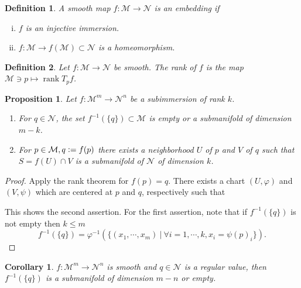 \documentclass[8pt]{article}
\newtheorem{proposition}{Proposition}[section]
\newtheorem{definition}{Definition}[section]
\newtheorem{corollary}{Corollary} [section]
\DeclareMathOperator{\rank}{rank}
\newcommand{\defeq}{\vcentcolon=}
\newcommand{\R}[0]{\mathbb{R}}
\newcommand{\M}[0]{\mathcal{M}}
\newcommand{\maniN}[0]{\mathcal{N}}
\newcommand{\sep}[0]{\:|\:}
\begin{document}
\begin{definition}
  A smooth map $f:\M\to\maniN$ is an embedding if 
  \begin{enumerate}[i).]
    \item $f$ is an injective immersion.
    \item $f:\M\to f(\M)\subset\maniN$ is a homeomorphism.
  \end{enumerate}
\end{definition}
\begin{definition}
  Let $f:\M\to\maniN$ be smooth. The rank of $f$ is the map $\M\ni p\mapsto \rank T_pf$.
\end{definition}
\begin{proposition}
  Let $f:\M^m\to\maniN^n$ be a subimmersion of rank $k$. 
  \begin{enumerate}[1).]
    \item For $q\in\maniN$, the set $f^{-1}(\{q\})\subset\M$ is empty or a submanifold of dimension $m-k$.
    \item For $p\in\M, q\defeq f(p)$ there exists a  neighborhood $U$ of $p$ and $V$ of $q$ such that $S=f(U)\cap V$ is a submanifold of $\maniN$ of dimension $k$.
  \end{enumerate}
\end{proposition}
\begin{proof}
  Apply the rank theorem for $f(p) = q$. There exists a chart $(U,\varphi)$ and $(V,\psi)$ which are centered at $p$ and $q$, respectively such that 
  \begin{center}
  \end{center}
  This shows the second assertion. For the first assertion, note that if $f^{-1}(\{q\})$ is not empty then $k\leq m$
  \begin{equation*}
    f^{-1}(\{q\}) = \varphi^{-1}(\{(x_1,\cdots,x_m)\sep \forall i = 1,\cdots,k, x_i = \psi(p)_i\}).
  \end{equation*}
\end{proof}
\begin{corollary}
  $f:\M^m\to\maniN^n$ is smooth and $q\in \maniN$ is a regular value, then $f^{-1}(\{q\})$ is a submanifold of dimension $m-n$ or empty.
\end{corollary}
\end{document}
